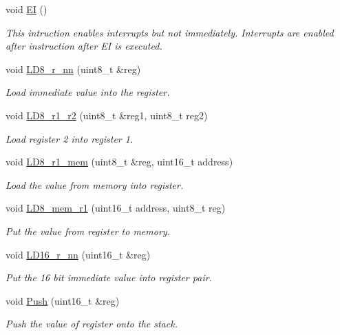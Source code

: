 \begin{DoxyCompactItemize}
\mbox{\label{classCPU_aea9192ba22a2c6e71874a999c1e78e05}} 
void \mbox{\hyperlink{classCPU_aea9192ba22a2c6e71874a999c1e78e05}{EI}} ()
\begin{DoxyCompactList}\small\item\em This intruction enables interrupts but not immediately. Interrupts are enabled after instruction after EI is executed. \end{DoxyCompactList}\item 
void \mbox{\hyperlink{classCPU_a5ab9827b65ff5a684cbc3ff01455ceaa}{L\+D8\+\_\+r\+\_\+nn}} (uint8\+\_\+t \&reg)
\begin{DoxyCompactList}\small\item\em Load immediate value into the register. \end{DoxyCompactList}\item 
void \mbox{\hyperlink{classCPU_a286b8ef2d55ac76be40389da5cd84ce4}{L\+D8\+\_\+r1\+\_\+r2}} (uint8\+\_\+t \&reg1, uint8\+\_\+t reg2)
\begin{DoxyCompactList}\small\item\em Load register 2 into register 1. \end{DoxyCompactList}\item 
void \mbox{\hyperlink{classCPU_a05339d6c6a297627b57ded8a5e098506}{L\+D8\+\_\+r1\+\_\+mem}} (uint8\+\_\+t \&reg, uint16\+\_\+t address)
\begin{DoxyCompactList}\small\item\em Load the value from memory into register. \end{DoxyCompactList}\item 
void \mbox{\hyperlink{classCPU_a216b7304251f4b2904b9304683949bae}{L\+D8\+\_\+mem\+\_\+r1}} (uint16\+\_\+t address, uint8\+\_\+t reg)
\begin{DoxyCompactList}\small\item\em Put the value from register to memory. \end{DoxyCompactList}\item 
void \mbox{\hyperlink{classCPU_a48040a29d7bc6450bcb12ce02c1f293d}{L\+D16\+\_\+r\+\_\+nn}} (uint16\+\_\+t \&reg)
\begin{DoxyCompactList}\small\item\em Put the 16 bit immediate value into register pair. \end{DoxyCompactList}\item 
void \mbox{\hyperlink{classCPU_ad221c9a597631210ff5869b5449299e0}{Push}} (uint16\+\_\+t \&reg)
\begin{DoxyCompactList}\small\item\em Push the value of register onto the stack. \end{DoxyCompactList}\item 

\end{DoxyCompactItemize}
